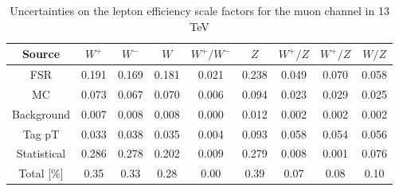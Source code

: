 \begin{table}[htbp]
\begin{center}
\begin{tabular}{ccccccccc}
\hline
Source & $W^+$& $W^-$ & $W$ & $W^+/W^-$ & $Z$ & $W^+/Z$&$W^+/Z$ &$W/Z$  \\
\hline \hline
FSR & 0.191 & 0.169 & 0.181 & 0.021 & 0.238 & 0.049 & 0.070 & 0.058 \\
MC & 0.073 & 0.067 & 0.070 & 0.006 & 0.094 & 0.023 & 0.029 & 0.025 \\
Background & 0.007 & 0.008 & 0.008 & 0.000 & 0.012 & 0.002 & 0.002 & 0.002 \\
Tag pT & 0.033 & 0.038 & 0.035 & 0.004 & 0.093 & 0.058 & 0.054 & 0.056 \\
Statistical & 0.286 & 0.278 & 0.202 & 0.009 & 0.279 & 0.008 & 0.001 & 0.076 \\
\hline \hline
Total [\%] & 0.35 & 0.33 & 0.28 & 0.00 & 0.39 & 0.07 & 0.08 & 0.10 \\

\end{tabular}
\end{center}
\caption{Uncertainties on the lepton efficiency scale factors for the muon channel in 13 TeV}
\label{tab:Eff:Unc:muon:summary:13}
\end{table}
